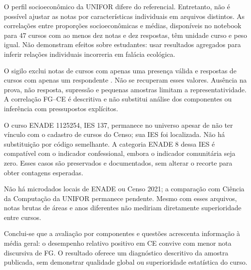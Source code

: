 \documentclass[12pt,a4paper]{article}
\begin{document}
O perfil socioeconômico da UNIFOR difere do referencial. Entretanto, não é
possível ajustar as notas por características individuais em arquivos distintos.
As correlações entre proporções socioeconômicas e médias, disponíveis no
notebook para 47 cursos com ao menos dez notas e dez respostas, têm unidade
curso e peso igual. Não demonstram efeitos sobre estudantes: usar resultados
agregados para inferir relações individuais incorreria em falácia ecológica.

O sigilo exclui notas de cursos com apenas uma presença válida e respostas
de cursos com apenas um respondente \cite[pp.~7--8]{manual}. Não se recuperam
esses valores. Ausência na prova, não resposta, supressão e pequenas amostras
limitam a representatividade. A correlação FG--CE é descritiva e não substitui
análise dos componentes ou inferência com pressupostos explícitos.

O curso ENADE 1125254, IES 137, permanece no universo apesar de não ter vínculo
com o cadastro de cursos do Censo; sua IES foi localizada. Não há substituição
por código semelhante. A categoria ENADE 8 dessa IES é compatível com o
indicador confessional, embora o indicador comunitária seja zero. Esses casos
são preservados e documentados, sem alterar o recorte para obter contagens esperadas.

Não há microdados locais de ENADE ou Censo 2021; a comparação com Ciência da
Computação da UNIFOR permanece pendente. Mesmo com esses arquivos, notas brutas
de áreas e anos diferentes não mediriam diretamente superioridade entre cursos.

Conclui-se que a avaliação por componentes e questões acrescenta informação
à média geral: o desempenho relativo positivo em CE convive com menor nota
discursiva de FG. O resultado oferece um diagnóstico descritivo da amostra
publicada, sem demonstrar qualidade global ou superioridade estatística do curso.
\end{document}
